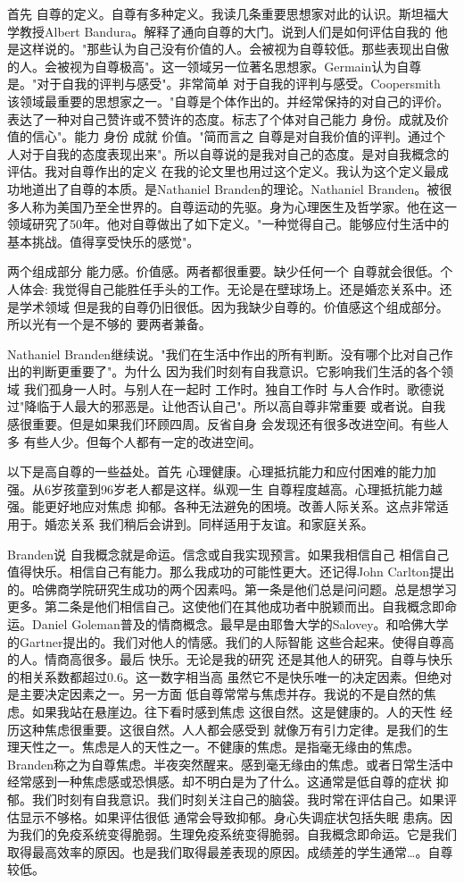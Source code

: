 首先 自尊的定义。自尊有多种定义。我读几条重要思想家对此的认识。斯坦福大学教授Albert Bandura。解释了通向自尊的大门。说到人们是如何评估自我的 他是这样说的。"那些认为自己没有价值的人。会被视为自尊较低。那些表现出自傲的人。会被视为自尊极高"。这一领域另一位著名思想家。Germain认为自尊是。"对于自我的评判与感受"。非常简单 对于自我的评判与感受。Coopersmith 该领域最重要的思想家之一。"自尊是个体作出的。并经常保持的对自己的评价。表达了一种对自己赞许或不赞许的态度。标志了个体对自己能力 身份。成就及价值的信心"。能力 身份 成就 价值。"简而言之 自尊是对自我价值的评判。通过个人对于自我的态度表现出来"。所以自尊说的是我对自己的态度。是对自我概念的评估。我对自尊作出的定义 在我的论文里也用过这个定义。我认为这个定义最成功地道出了自尊的本质。是Nathaniel Branden的理论。Nathaniel Branden。被很多人称为美国乃至全世界的。自尊运动的先驱。身为心理医生及哲学家。他在这一领域研究了50年。他对自尊做出了如下定义。"一种觉得自己。能够应付生活中的基本挑战。值得享受快乐的感觉"。 

两个组成部分 能力感。价值感。两者都很重要。缺少任何一个 自尊就会很低。个人体会: 我觉得自己能胜任手头的工作。无论是在壁球场上。还是婚恋关系中。还是学术领域 但是我的自尊仍旧很低。因为我缺少自尊的。价值感这个组成部分。所以光有一个是不够的 要两者兼备。 

Nathaniel Branden继续说。"我们在生活中作出的所有判断。没有哪个比对自己作出的判断更重要了"。为什么 因为我们时刻有自我意识。它影响我们生活的各个领域 我们孤身一人时。与别人在一起时 工作时。独自工作时 与人合作时。歌德说过"降临于人最大的邪恶是。让他否认自己"。所以高自尊非常重要 或者说。自我感很重要。但是如果我们环顾四周。反省自身 会发现还有很多改进空间。有些人多 有些人少。但每个人都有一定的改进空间。 

以下是高自尊的一些益处。首先 心理健康。心理抵抗能力和应付困难的能力加强。从6岁孩童到96岁老人都是这样。纵观一生 自尊程度越高。心理抵抗能力越强。能更好地应对焦虑 抑郁。各种无法避免的困境。改善人际关系。这点非常适用于。婚恋关系 我们稍后会讲到。同样适用于友谊。和家庭关系。 

Branden说 自我概念就是命运。信念或自我实现预言。如果我相信自己 相信自己值得快乐。相信自己有能力。那么我成功的可能性更大。还记得John Carlton提出的。哈佛商学院研究生成功的两个因素吗。第一条是他们总是问问题。总是想学习更多。第二条是他们相信自己。这使他们在其他成功者中脱颖而出。自我概念即命运。Daniel Goleman普及的情商概念。最早是由耶鲁大学的Salovey。和哈佛大学的Gartner提出的。我们对他人的情感。我们的人际智能 这些合起来。使得自尊高的人。情商高很多。最后 快乐。无论是我的研究 还是其他人的研究。自尊与快乐的相关系数都超过0.6。这一数字相当高 虽然它不是快乐唯一的决定因素。但绝对是主要决定因素之一。另一方面 低自尊常常与焦虑并存。我说的不是自然的焦虑。如果我站在悬崖边。往下看时感到焦虑 这很自然。这是健康的。人的天性 经历这种焦虑很重要。这很自然。人人都会感受到 就像万有引力定律。是我们的生理天性之一。焦虑是人的天性之一。不健康的焦虑。是指毫无缘由的焦虑。Branden称之为自尊焦虑。半夜突然醒来。感到毫无缘由的焦虑。或者日常生活中经常感到一种焦虑感或恐惧感。却不明白是为了什么。这通常是低自尊的症状 抑郁。我们时刻有自我意识。我们时刻关注自己的脑袋。我时常在评估自己。如果评估显示不够格。如果评估很低 通常会导致抑郁。身心失调症状包括失眠 患病。因为我们的免疫系统变得脆弱。生理免疫系统变得脆弱。自我概念即命运。它是我们取得最高效率的原因。也是我们取得最差表现的原因。成绩差的学生通常…。自尊较低。 


